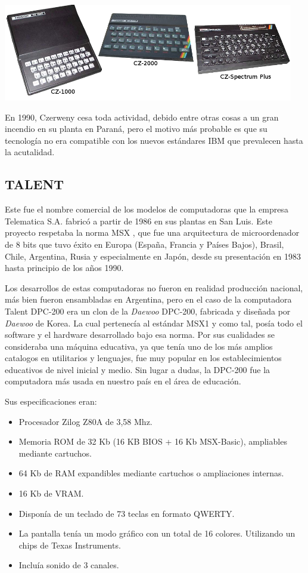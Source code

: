\documentclass[%
 	final,
%
	notitlepage,
	narroweqnarray,
	inline,
 	twoside,
	]{ieee}
\begin{document}
\begin{center}\includegraphics[width=360pt, height=120pt]{serieCZ.png}\end{center}
En 1990, Czerweny cesa toda actividad, debido entre otras cosas a un gran incendio en su planta en Paran\'a, pero el motivo m\'as probable es que su tecnolog\'ia no era compatible con los nuevos est\'andares IBM que prevalecen hasta la acutalidad.

\subsection*{TALENT}

Este fue el nombre comercial de los modelos de computadoras que la empresa Telematica S.A. fabric\'o a partir de 1986 en sus plantas en San Luis. Este proyecto respetaba la norma MSX \cite{msx}, que fue una arquitectura de microordenador de 8 bits que tuvo \'exito en Europa (Espa\~na, Francia y Pa\'ises Bajos), Brasil, Chile, Argentina, Rusia y especialmente en Jap\'on, desde su presentaci\'on en 1983 hasta principio de los a\~nos 1990.

Los desarrollos de estas computadoras no fueron en realidad producci\'on nacional, m\'as bien fueron ensambladas en Argentina, pero en el caso de la computadora Talent DPC-200 era un clon de la \textit{Daewoo} DPC-200, fabricada y dise\~nada por \textit{Daewoo} de Korea. La cual pertenec\'ia al est\'andar MSX1 y como tal, pos\'ia todo el software y el hardware desarrollado bajo esa norma.
Por sus cualidades se consideraba una m\'aquina educativa, ya que ten\'ia uno de los m\'as amplios catalogos en utilitarios y lenguajes, fue muy popular en los establecimientos educativos de nivel inicial y medio. Sin lugar a dudas, la DPC-200 fue la computadora m\'as usada en nuestro pa\'is en el \'area de educaci\'on.

Sus especificaciones eran:\\

\begin{itemize}
\item Procesador Zilog Z80A de 3,58 Mhz.
\item Memoria ROM de 32 Kb (16 KB BIOS + 16 Kb MSX-Basic), ampliables mediante cartuchos.
\item 64 Kb de RAM expandibles mediante cartuchos o ampliaciones internas.
\item 16 Kb de VRAM.
\item Dispon\'ia de un teclado de 73 teclas en formato QWERTY.
\item La pantalla ten\'ia un modo gr\'afico con un total de 16 colores. Utilizando un chips de Texas Instruments.
\item Inclu\'ia sonido de 3 canales.\\
\end{itemize}
\end{document}
